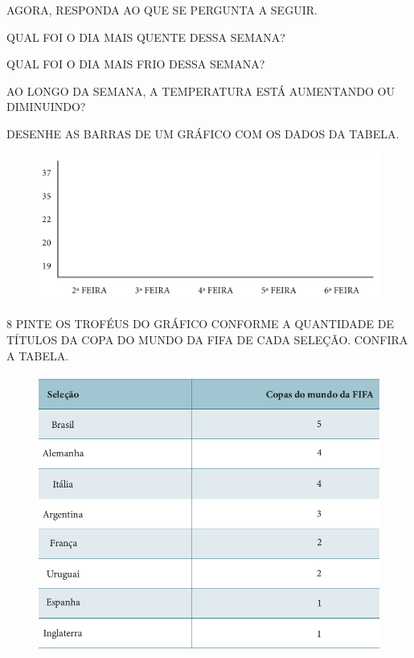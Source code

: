 AGORA, RESPONDA AO QUE SE PERGUNTA A SEGUIR.

\begin{escolha}
\item QUAL FOI O DIA MAIS QUENTE DESSA SEMANA?\\

\item QUAL FOI O DIA MAIS FRIO DESSA SEMANA?\\
\enlargethispage{2\baselineskip}

\item AO LONGO DA SEMANA, A TEMPERATURA ESTÁ AUMENTANDO OU DIMINUINDO?\\

\item DESENHE AS BARRAS DE UM GRÁFICO COM OS DADOS DA TABELA.

\begin{figure}[htpb!]
\centering
\includegraphics[width=\textwidth]{./media/SAEB_1ANO_MAT_FIGURA106.png}
\end{figure}

\end{escolha}


\num{8} PINTE OS TROFÉUS DO GRÁFICO CONFORME A QUANTIDADE DE TÍTULOS DA COPA DO
MUNDO DA FIFA DE CADA SELEÇÃO. CONFIRA A TABELA.

\begin{figure}[H]
\centering
\includegraphics[width=.8\textwidth]{./media/SAEB_1ANO_MAT_FIGURA107.png}
\end{figure}

